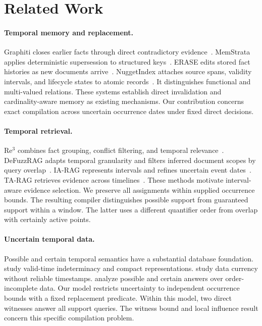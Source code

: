 \section{Related Work}
\label{sec:related}

\paragraph{Temporal memory and replacement.}
Graphiti closes earlier facts through direct contradictory evidence~\citep{rasmussen2025zep,graphiti2026source}.
MemStrata applies deterministic supersession to structured keys~\citep{yadav2026memstrata}.
ERASE edits stored fact histories as new documents arrive~\citep{li2025erase}.
NuggetIndex attaches source spans, validity intervals, and lifecycle states to atomic records~\citep{zerhoudi2026nuggetindex}.
It distinguishes functional and multi-valued relations.
These systems establish direct invalidation and cardinality-aware memory as existing mechanisms.
Our contribution concerns exact compilation across uncertain occurrence dates under fixed direct decisions.

\paragraph{Temporal retrieval.}
Re$^3$ combines fact grouping, conflict filtering, and temporal relevance~\citep{cao2026re3}.
DeFuzzRAG adapts temporal granularity and filters inferred document scopes by query overlap~\citep{chen2026defuzzrag}.
IA-RAG represents intervals and refines uncertain event dates~\citep{wang2026iarag}.
TA-RAG retrieves evidence across timelines~\citep{lau2025tarag}.
These methods motivate interval-aware evidence selection.
We preserve all assignments within supplied occurrence bounds.
The resulting compiler distinguishes possible support from guaranteed support within a window.
The latter uses a different quantifier order from overlap with certainly active points.

\paragraph{Uncertain temporal data.}
Possible and certain temporal semantics have a substantial database foundation.
\citet{anselma2013indeterminacy} study valid-time indeterminacy and compact representations.
\citet{fan2012currency} study data currency without reliable timestamps.
\citet{amarilli2017order} analyze possible and certain answers over order-incomplete data.
Our model restricts uncertainty to independent occurrence bounds with a fixed replacement predicate.
Within this model, two direct witnesses answer all support queries.
The witness bound and local influence result concern this specific compilation problem.

